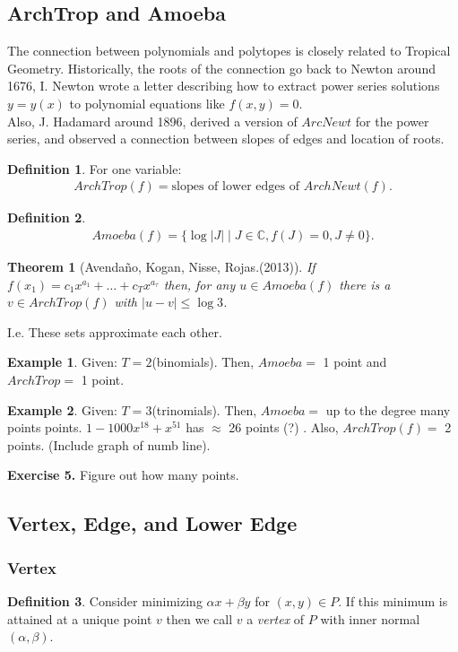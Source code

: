 \documentclass[]{article}
\newtheorem*{theorem}{Theorem}
\theoremstyle{definition}
\newtheorem*{defn}{Definition}
\newtheorem{ex}{Example}[section]
\begin{document}
			\subsection{ArchTrop and Amoeba}
			The connection between polynomials and polytopes is closely related to Tropical Geometry. Historically, the roots of the connection go back to Newton around 1676, I. Newton wrote a letter describing how to extract power series solutions $y=y(x)$ to polynomial equations like $f(x,y)=0$.\\
			Also, J. Hadamard around 1896, derived a version of $ArcNewt$ for the power series, and observed a connection between slopes of edges and location of roots.
			\begin{defn} For one variable:
			\begin{align*}
			ArchTrop(f)= \text{slopes of lower edges of $ArchNewt(f)$}.
			\end{align*}
			\end{defn}
						\begin{defn}
			\begin{align*}
			Amoeba(f)= \{\log|J| \mid J \in \mathbb{C}, f(J)=0, J\neq 0\}.
			\end{align*}
			\end{defn}
			\begin{theorem}[Avenda\~{n}o, Kogan, Nisse, Rojas.(2013)] If $f(x_1)=c_1x^{a_1}+\dots+c_Tx^{a_\tau}$ then, for any $u \in Amoeba(f)$ there is a $v\in ArchTrop(f)$ with $|u-v| \leq \log 3$.
			\end{theorem}
			 I.e. These sets approximate each other.
			\begin{ex} Given: $T=2$(binomials). Then, $Amoeba = $ 1 point and $ArchTrop=$ 1 point.
			\end{ex}
			\begin{ex} Given: $T=3$(trinomials). Then, $Amoeba = $ up to the degree many points points. $1-1000x^{18}+x^{51}$ has $\approx$ 26 points (?) . Also, $ArchTrop(f)=$ 2 points. (Include graph of numb line).
			\end{ex}
			\textbf{Exercise 5.} Figure out how many points.\\
			\subsection{Vertex, Edge, and Lower Edge}
			\subsubsection{Vertex}
			\begin{defn}
			Consider minimizing $\alpha x+\beta y$ for $(x,y)\in P.$ If this minimum is attained at a unique point $v$ then we call $v$ a \emph{vertex} of $P$ with inner normal $(\alpha,\beta)$.
			\end{defn}
\end{document}
